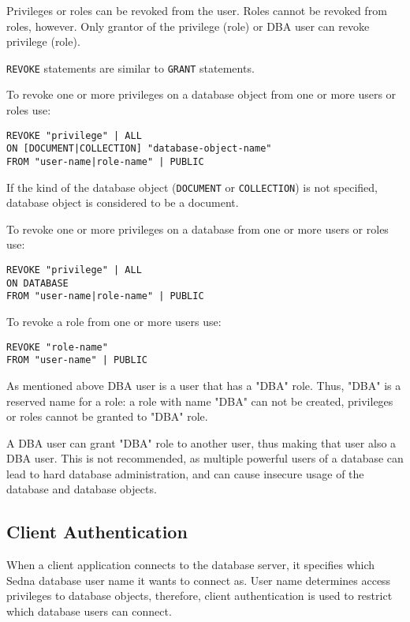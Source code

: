 \documentclass[a4paper,12pt]{article}
\begin{document}
Privileges or roles can be revoked from the user. Roles cannot be revoked from
roles, however. Only grantor of the privilege (role) or DBA user can revoke
privilege (role).

\verb!REVOKE! statements are similar to \verb!GRANT! statements.

To revoke one or more privileges on a database object from one or more users or
roles use:

\begin{verbatim}
REVOKE "privilege" | ALL
ON [DOCUMENT|COLLECTION] "database-object-name"
FROM "user-name|role-name" | PUBLIC
\end{verbatim}

If the kind of the database object (\verb!DOCUMENT! or \verb!COLLECTION!) is not
specified, database object is considered to be a document.

To revoke one or more privileges on a database from one or more users or roles
use:

\begin{verbatim}
REVOKE "privilege" | ALL
ON DATABASE
FROM "user-name|role-name" | PUBLIC
\end{verbatim}

To revoke a role from one or more users use:

\begin{verbatim}
REVOKE "role-name"
FROM "user-name" | PUBLIC
\end{verbatim}

As mentioned above DBA user is a user that has a "DBA" role. Thus, "DBA" is a
reserved name for a role: a role with name "DBA" can not be created, privileges
or roles cannot be granted to "DBA" role.

A DBA user can grant "DBA" role to another user, thus making that user also a
DBA user. This is not recommended, as multiple powerful users of a database can
lead to hard database administration, and can cause insecure usage of the
database and database objects.


\subsection{Client Authentication}

When a client application connects to the database server, it specifies which
Sedna database user name it wants to connect as. User name determines access
privileges to database objects, therefore, client authentication is used to
restrict which database users can connect.
\end{document}
